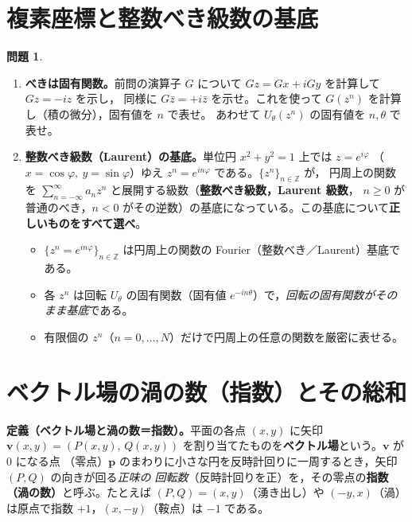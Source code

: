 \documentclass[dvipdfmx, uplatex]{jsarticle}
\theoremstyle{definition}
\newtheorem*{prob}{問題}
\begin{document}
\section{複素座標と整数べき級数の基底}
\begin{prob}
\begin{enumerate}[start=6]
\item \textbf{べきは固有関数。}前問の演算子 $G$ について $G z=Gx+iGy$ を計算して $Gz=-iz$ を示し，
同様に $G\bar z=+i\bar z$ を示せ。これを使って $G(z^n)$ を計算し（積の微分），固有値を $n$ で表せ。
あわせて $U_\theta(z^n)$ の固有値を $n,\theta$ で表せ。
\item \textbf{整数べき級数（Laurent）の基底。}単位円 $x^2+y^2=1$ 上では $z=e^{i\varphi}$
（$x=\cos\varphi,\ y=\sin\varphi$）ゆえ $z^n=e^{in\varphi}$ である。$\{z^n\}_{n\in\mathbb{Z}}$ が，
円周上の関数を $\displaystyle\sum_{n=-\infty}^{\infty}a_n z^n$ と展開する級数（\textbf{整数べき級数，Laurent 級数}，
$n\ge0$ が普通のべき，$n<0$ がその逆数）の基底になっている。この基底について\textbf{正しいものをすべて選べ}。
\begin{itemize}\setlength{\itemsep}{1pt}
\item[(あ)] $\{z^n=e^{in\varphi}\}_{n\in\mathbb{Z}}$ は円周上の関数の Fourier（整数べき／Laurent）基底である。
\item[(い)] 各 $z^n$ は回転 $U_\theta$ の固有関数（固有値 $e^{-in\theta}$）で，\emph{回転の固有関数がそのまま基底}である。
\item[(う)] 有限個の $z^n$（$n=0,\dots,N$）だけで円周上の任意の関数を厳密に表せる。
\end{itemize}
\end{enumerate}
\end{prob}

\section{ベクトル場の渦の数（指数）とその総和}
\noindent\textbf{定義（ベクトル場と渦の数＝指数）。}平面の各点 $(x,y)$ に矢印
$\bm v(x,y)=(P(x,y),\,Q(x,y))$ を割り当てたものを\textbf{ベクトル場}という。$\bm v$ が $0$ になる点
（零点）$\bm p$ のまわりに小さな円を反時計回りに一周するとき，矢印 $(P,Q)$ の向きが回る\emph{正味の
回転数}（反時計回りを正）を，その零点の\textbf{指数（渦の数）}と呼ぶ。たとえば $(P,Q)=(x,y)$（湧き出し）や
$(-y,x)$（渦）は原点で指数 $+1$，$(x,-y)$（鞍点）は $-1$ である。
\end{document}
